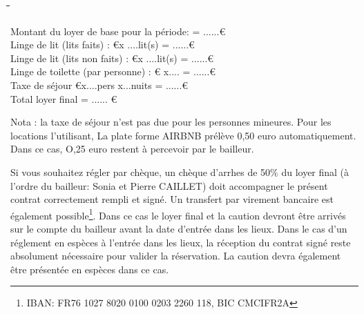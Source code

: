 \documentclass[a4paper,11pt]{article}
\begin{document}
\begin{tabbing}
  
 \hspace{6cm}\=  										\hspace{1cm}\=   	\hspace{4cm}\= 	\hspace{2cm}\= 		\hspace{2cm}\=	\kill


Montant du loyer de base pour la période: \>		\>		\>=			\>......\>\euro	   		\\
Linge de lit (lits faits) :			 					\euro		      			\>x ....lit(s)       				\>=  			\>......\>\euro				\\

Linge de lit (lits non faits) :			 					\euro		      			\>x ....lit(s)       				\>=  			\>......\>\euro				\\



Linge de toilette (par personne) :					 					\euro      				\> x....							\>=  			\>......\>\euro				\\

Taxe de séjour \euro		\>x....pers x...nuits		\>=			\>......\>\euro	   		\\

Total loyer final    										\>						\>  					\>=  							\>......					\>\euro			\\ 

 \end{tabbing}


\vspace{0.5cm}

Nota : la taxe de séjour n’est pas due pour les personnes mineures. Pour les locations
l’utilisant, La plate forme AIRBNB prélève 0,50 euro automatiquement. Dans ce cas,
O,25 euro restent à percevoir par le bailleur.
\vspace{0.5cm}

  
Si vous souhaitez régler par chèque, un chèque d'arrhes de 50\% du loyer final (à l'ordre du bailleur: Sonia et Pierre CAILLET)  doit accompagner le présent contrat correctement rempli et signé. 
Un transfert par virement bancaire est également possible\footnote{IBAN: FR76 1027 8020 0100 0203 2260 118, BIC CMCIFR2A}. Dans ce cas le loyer final et la caution devront être arrivés sur le compte du bailleur avant la date d'entrée dans les lieux.
Dans le cas d'un réglement en espèces à l'entrée dans les lieux, la réception du contrat signé reste absolument nécessaire pour valider la réservation. La caution devra également être présentée en espèces dans ce cas.
\end{document}
